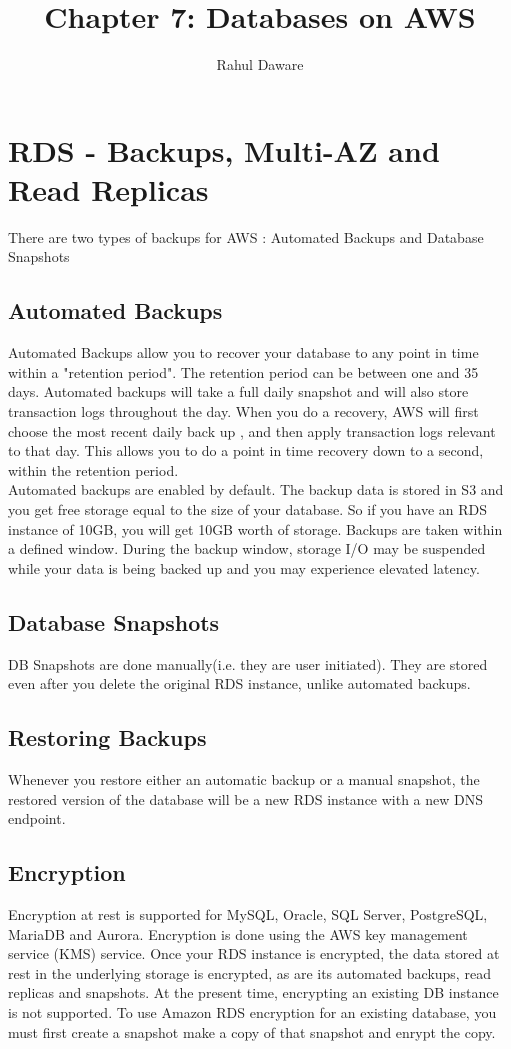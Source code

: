 \documentclass{article}
\author{Rahul Daware}
\begin{document}
\title{Chapter 7: Databases on AWS}
\maketitle
\newpage
\tableofcontents
\newpage

\section{RDS - Backups, Multi-AZ and Read Replicas}

There are two types of backups for AWS : Automated Backups and Database Snapshots

\subsection{Automated Backups}
Automated Backups allow you to recover your database to any point in time within a "retention period". The retention period can be between one and 35 days. Automated backups will take a full daily snapshot and will also store transaction logs throughout the day. When you do a recovery, AWS will first choose the most recent daily back up , and then apply transaction logs relevant to that day. This allows you to do a point in time recovery down to a second, within the retention period. \\
Automated backups are enabled by default. The backup data is stored in S3 and you get free storage equal to the size of your database. So if you have an RDS instance of 10GB, you will get 10GB worth of storage. Backups are taken within a defined window. During the backup window, storage I/O may be suspended while your data is being backed up and you may experience elevated latency.

\subsection{Database Snapshots}
DB Snapshots are done manually(i.e. they are user initiated). They are stored even after you delete the original RDS instance, unlike automated backups.

\subsection{Restoring Backups}
Whenever you restore either an automatic backup or a manual snapshot, the restored version of the database will be a new RDS instance with a new DNS endpoint.

\subsection{Encryption}
Encryption at rest is supported for MySQL, Oracle, SQL Server, PostgreSQL, MariaDB and Aurora. Encryption is done using the AWS key management service (KMS) service. Once your RDS instance is encrypted, the data stored at rest in the underlying storage is encrypted, as are its automated backups, read replicas and snapshots. At the present time, encrypting an existing DB instance is not supported. To use Amazon RDS encryption for an existing database, you must first create a snapshot make a copy of that snapshot and enrypt the copy.
\end{document}
